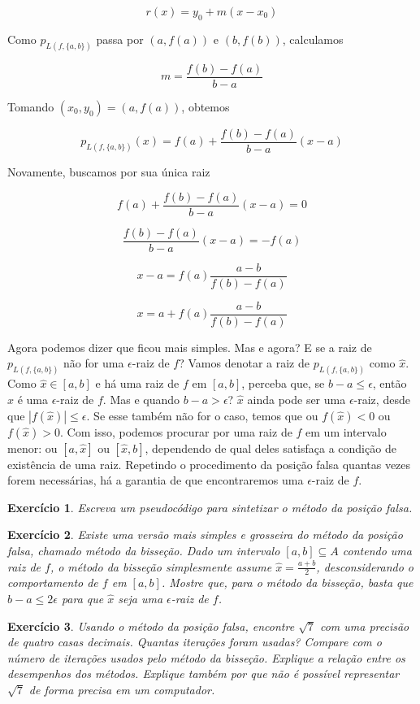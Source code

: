 \documentclass[]{article}
\newtheorem{exercicio}{Exercício}
\numberwithin{equation}{section}
\begin{document}
$$
r(x) = y_0 + m(x - x_0)
$$

Como $p_{L(f, \{a, b\})}$ passa por $(a, f(a))$ e $(b, f(b))$, calculamos

$$
m = \frac{f(b) - f(a)}{b - a}
$$

Tomando $(x_0, y_0) = (a, f(a))$, obtemos

$$
p_{L(f, \{a, b\})}(x) = f(a) + \frac{f(b) - f(a)}{b - a}(x - a)
$$

Novamente, buscamos por sua única raiz

$$
f(a) + \frac{f(b) - f(a)}{b - a}(x - a) = 0
$$

$$
\frac{f(b) - f(a)}{b - a}(x - a) = -f(a)
$$

$$
x - a = f(a) \frac{a - b}{f(b) - f(a)}
$$

$$
x = a + f(a) \frac{a - b}{f(b) - f(a)}
$$

Agora podemos dizer que ficou mais simples. Mas e agora? E se a raiz de $p_{L(f, \{a, b\})}$ não for uma $\epsilon$-raiz de $f$? Vamos denotar a raiz de $p_{L(f, \{a, b\})}$ como $\hat{x}$. Como $\hat{x} \in [a, b]$ e há uma raiz de $f$ em $[a, b]$, perceba que, se $b - a \leq \epsilon$, então $\hat{x}$ é uma $\epsilon$-raiz de $f$. Mas e quando $b - a > \epsilon$? $\hat{x}$ ainda pode ser uma $\epsilon$-raiz, desde que $|f(\hat{x})| \leq \epsilon$. Se esse também não for o caso, temos que ou $f(\hat{x}) < 0$ ou $f(\hat{x}) > 0$. Com isso, podemos procurar por uma raiz de $f$ em um intervalo menor: ou $[a, \hat{x}]$ ou $[\hat{x}, b]$, dependendo de qual deles satisfaça a condição de existência de uma raiz. Repetindo o procedimento da posição falsa quantas vezes forem necessárias, há a garantia de que encontraremos uma $\epsilon$-raiz de $f$.

\begin{exercicio}
	Escreva um pseudocódigo para sintetizar o método da posição falsa.
\end{exercicio}

\begin{exercicio}
	Existe uma versão mais simples e grosseira do método da posição falsa, chamado método da bisseção. Dado um intervalo $[a, b] \subseteq A$ contendo uma raiz de $f$, o método da bisseção simplesmente assume $\hat{x} = \frac{a + b}{2}$, desconsiderando o comportamento de $f$ em $[a, b]$. Mostre que, para o método da bisseção, basta que $b - a \leq 2\epsilon$ para que $\hat{x}$ seja uma $\epsilon$-raiz de $f$.
\end{exercicio}

\begin{exercicio}
	Usando o método da posição falsa, encontre $\sqrt{7}$ com uma precisão de quatro casas decimais. Quantas iterações foram usadas? Compare com o número de iterações usados pelo método da bisseção. Explique a relação entre os desempenhos dos métodos. Explique também por que não é possível representar $\sqrt{7}$ de forma precisa em um computador.
\end{exercicio}
\end{document}
